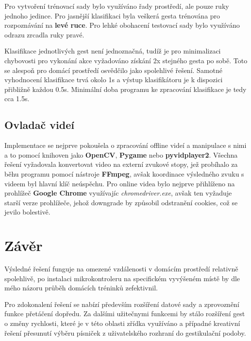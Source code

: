 \documentclass[titlepage, a4paper, 11pt]{article}
\begin{document}
Pro vytvoření trénovací sady bylo využíváno řady prostředí, ale pouze ruky jednoho jedince. Pro jasnější klasifikaci byla veškerá gesta trénována pro rozpoznávání na \textbf{levé ruce}. Pro lehké obohacení testovací sady bylo využíváno odrazu zrcadla ruky pravé.

Klasifikace jednotlivých gest není jednoznačná, tudíž je pro minimalizaci chybovosti pro vykonání akce vyžadováno získání 2x stejného gesta po sobě. Toto se alespoň pro domácí prostředí osvědčilo jako spolehlivé řešení. Samotné vyhodnocení klasifikace trvá okolo 1s a výstup klasifikátoru je k dispozici přibližně každou 0.5s. Minimální doba programu ke zpracování klasifikace je tedy cca 1.5s.

\subsection{Ovladač videí}

Implementace se nejprve pokoušela o zpracování offline videí a manipulace s nimi a to pomocí knihoven jako \textbf{OpenCV}, \textbf{Pygame} nebo \textbf{pyvidplayer2}. Všechna řešení vyžadovala konvertovat video na externí zvukové stopy, jež probíhalo za běhu programu pomocí nástroje \textbf{FFmpeg}, avšak koordinace výsledného zvuku s videem byl hlavní klíč neúspěchu. Pro online videa bylo nejprve přihlíženo na prohlížeč \textbf{Google Chrome} využívajíc \textit{chromedriver.exe}, avšak ten vyžaduje starší verze prohlížeče, jehož downgrade by způsobil odstranění cookies, což se jevilo bolestivě.

\section{Závěr}

Výsledné řešení funguje na omezené vzdálenosti v domácím prostředí relativně spolehlivě, po instalaci mikrokontroleru na specifickém vyvýšeném místě by dle mého názoru průběh domácích tréninků zefektivnil. 

Pro zdokonalení řešení se nabízí především rozšíření datové sady a zprovoznění funkce přetáčení dopředu. Za dalšími užitečnymi funkcemi by stálo rozšíření gest o změny rychlosti, které je v této oblasti zřídka využíváno a případné kreativní řešení přesunutí výběru písniček z uživatelského rozhraní do gestikulační podoby.
\end{document}
